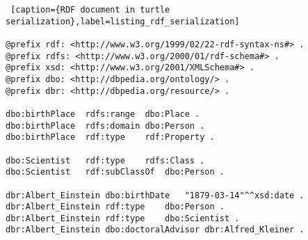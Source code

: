 \begin{minipage}{\textwidth}
\begin{lstlisting} [caption={RDF document in turtle serialization},label=listing_rdf_serialization]

@prefix rdf: <http://www.w3.org/1999/02/22-rdf-syntax-ns#> .
@prefix rdfs: <http://www.w3.org/2000/01/rdf-schema#> .
@prefix xsd: <http://www.w3.org/2001/XMLSchema#> .
@prefix dbo: <http://dbpedia.org/ontology/> .
@prefix dbr: <http://dbpedia.org/resource/> .

dbo:birthPlace	rdfs:range	dbo:Place .
dbo:birthPlace	rdfs:domain	dbo:Person .
dbo:birthPlace	rdf:type	rdf:Property .

dbo:Scientist	rdf:type	rdfs:Class .
dbo:Scientist	rdf:subClassOf	dbo:Person .

dbr:Albert_Einstein	dbo:birthDate	"1879-03-14"^^xsd:date .
dbr:Albert_Einstein	rdf:type	dbo:Person .
dbr:Albert_Einstein	rdf:type	dbo:Scientist .
dbr:Albert_Einstein	dbo:doctoralAdvisor	dbr:Alfred_Kleiner .
\end{lstlisting}
\end{minipage}